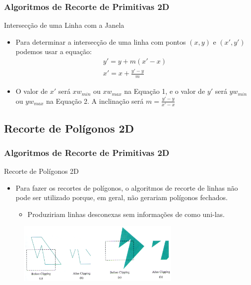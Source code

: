 \documentclass{beamer}
\begin{document}
\begin{frame}
\frametitle{Algoritmos de Recorte de Primitivas 2D}

	\begin{block}{Intersecção de uma Linha com a Janela}
		\begin{itemize}
			\item Para determinar a intersecção de uma linha com pontos $(x,y)$ e $(x',y')$ podemos usar a equação:
			\begin{eqnarray}
				y' = y + m(x'-x) \\
				x' = x + \frac{y' - y}{m}
			\end{eqnarray}
			\item O valor de $x'$ será $xw_{min}$ ou $xw_{max}$ na Equação 1, e o valor de $y'$ será $yw_{min}$ ou $yw_{max}$ na Equação 2. A inclinação será $m = \frac{y'-y}{x'-x}$
		\end{itemize}
	\end{block}
	
\end{frame}

\subsection{Recorte de Polígonos 2D}
\begin{frame}
\frametitle{Algoritmos de Recorte de Primitivas 2D}

	\begin{block}{Recorte de Polígonos 2D}
		\begin{itemize}
			\item Para fazer os recortes de polígonos, o algoritmos de recorte de linhas não pode ser utilizado porque, em geral, não gerariam polígonos fechados.
			\begin{itemize}
				\item Produziriam linhas desconexas sem informações de como uni-las.
			\end{itemize}
		\end{itemize}
	\end{block}
	
	\begin{figure}[!h]
			\begin{center}
				\includegraphics[width=0.7\textwidth]{Figures/RecPol}
			\end{center}
	\end{figure}	
	
\end{frame}
\end{document}
